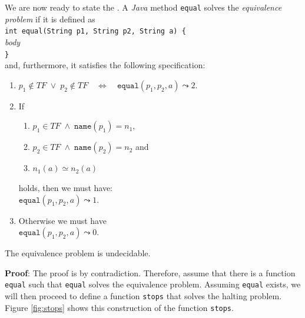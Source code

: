 \noindent
We are now ready to state the .
A \textsl{Java} method \texttt{equal} solves the
\emph{equivalence problem}  if it is defined as
\\[0.2cm]
\hspace*{1.3cm} \texttt{int equal(String p1, String p2, String a) \{}               \\
\hspace*{2.1cm} \textsl{body}                                \\[0.2cm]
\hspace*{1.3cm} \texttt{\}}                                \\[0.2cm]
and, furthermore, it satisfies the following specification:

\begin{enumerate}
\item $p_1 \not\in T\!F \;\vee\; p_2 \not\in T\!F \quad\Leftrightarrow\quad \mathtt{equal}(p_1, p_2, a) \leadsto 2$.
\item If 
      \begin{enumerate}
      \item $p_1 \in T\!F \;\wedge\; \mathtt{name}(p_1) = n_1$,
      \item $p_2 \in T\!F \;\wedge\; \mathtt{name}(p_2) = n_2$ \quad and
      \item $n_1(a) \simeq n_2(a)$
      \end{enumerate}
      holds, then we must have: 
      \\[0.2cm]
      \hspace*{1.3cm} 
      $\mathtt{equal}(p_1, p_2, a) \leadsto 1$.
\item Otherwise we must have \\[0.2cm]
      \hspace*{1.3cm} 
      $\mathtt{equal}(p_1, p_2, a) \leadsto 0$.
\end{enumerate}


\begin{Theorem}
The equivalence problem is undecidable.  
\end{Theorem}

\noindent
\textbf{Proof}:
The proof is by contradiction.
Therefore, assume that there is a function \texttt{equal}
such that \texttt{equal} solves the equivalence problem.
Assuming \texttt{equal} exists, we will
then proceed to define a function \texttt{stops} that solves the halting problem.
Figure \ref{fig:stops} shows this construction of the function \texttt{stops}.

